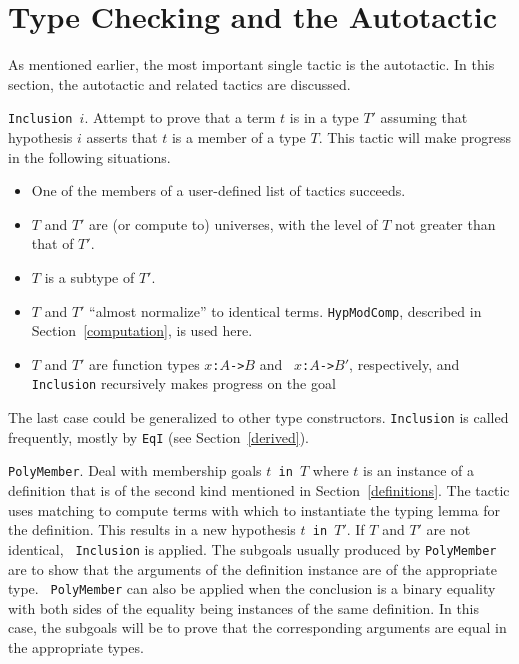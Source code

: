 \section{Type Checking and the Autotactic}

\label{autotactic}

As mentioned earlier, the most important single tactic is the autotactic.  In
this section, the autotactic and related tactics are discussed.

{\tt Inclusion $i$}.  Attempt to prove that a term $t$ is in a type $T'$
assuming that hypothesis $i$ asserts that 
$t$ is a member of a type $T$.  This
tactic will make progress in the following situations.
\begin{itemize}
\item One of the members of a user-defined list of tactics succeeds.
\item $T$ and $T'$ are (or compute to) universes, with the level of $T$ not
greater than that of $T'$.
\item $T$ is a subtype of $T'$.
\item $T$ and $T'$ ``almost normalize'' to identical terms.  {\tt HypModComp},
described in Section~\ref{computation}, is used here.
\item $T$ and $T'$ are function types {\tt $x$:$A$->$B$} and {\tt
$x$:$A$->$B'$}, respectively, and {\tt Inclu\-sion} recursively
makes progress on the goal
\begin{Numath}
\end{Numath}%
\end{itemize}
The last case could be generalized to other type
constructors.   {\tt Inclu\-sion} is called
frequently, mostly by {\tt EqI} (see Section~\ref{derived}).  

{\tt PolyMember}.  Deal with membership goals {\tt $t$~in~$T$} where $t$ is an
instance of a definition that is of the second kind mentioned in
Section~\ref{definitions}.  The tactic uses matching to compute terms with which
to instantiate the typing lemma for the definition.  This results in a new
hypothesis {\tt $t$~in~$T'$}.  If $T$ and $T'$ are not identical, {\tt
Inclusion} is applied.  The subgoals usually produced by {\tt PolyMember} are to
show that the arguments of the definition instance are of the appropriate type.
{\tt
PolyMember} can also be applied when the conclusion is a binary equality with
both sides of the equality being instances of the same definition. In this case,
the subgoals will be to prove that the corresponding arguments are equal in the
appropriate types.

